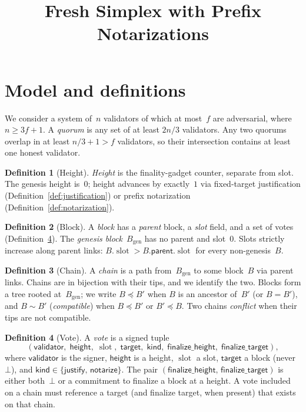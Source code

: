 \documentclass{article}
\title{Fresh Simplex with Prefix Notarizations}
\newcommand{\genesis}{\ensuremath{B_{\mathrm{gen}}}}
\newcommand{\slot}[0]{\ensuremath{\operatorname{\mathrm{slot}}}}
\newcommand{\target}{\mathsf{target}}
\newcommand{\kind}{\mathsf{kind}}
\newcommand{\height}{\mathsf{height}}
\newcommand{\validator}{\mathsf{validator}}
\newcommand{\just}{\ensuremath{\mathsf{justify}}\xspace}
\newcommand{\notar}{\ensuremath{\mathsf{notarize}}\xspace}
\newcommand{\parent}{\mathsf{parent}}
\newcommand{\finalizeHeight}{\mathsf{finalize\_height}}
\newcommand{\finalizeTarget}{\mathsf{finalize\_target}}
\theoremstyle{plain}
\theoremstyle{definition}
\newtheorem{definition}{Definition}
\theoremstyle{remark}
\begin{document}
\maketitle

\section{Model and definitions}

We consider a system of~$n$ validators of which at most~$f$ are adversarial, where $n \geq 3f + 1$.
A \emph{quorum} is any set of at least $2n/3$ validators.
Any two quorums overlap in at least $n/3 + 1 > f$ validators, so their intersection contains at least one honest validator.

\begin{definition}[Height]\label{def:height}
\emph{Height} is the finality-gadget counter, separate from slot.
The genesis height is~$0$; height advances by exactly~$1$ via fixed-target justification (Definition~\ref{def:justification}) or prefix notarization (Definition~\ref{def:notarization}).
\end{definition}

\begin{definition}[Block]\label{def:block}
A \emph{block} has a \emph{parent} block, a \emph{slot} field, and a set of votes (Definition~\ref{def:vote}).
The \emph{genesis block}~$\genesis$ has no parent and slot~$0$.
Slots strictly increase along parent links: $B.\slot > B.\parent.\slot$ for every non-genesis~$B$.
\end{definition}

\begin{definition}[Chain]\label{def:chain}
A \emph{chain} is a path from~$\genesis$ to some block~$B$ via parent links.
Chains are in bijection with their tips, and we identify the two.
Blocks form a tree rooted at~$\genesis$; we write $B \preceq B'$ when $B$ is an ancestor of~$B'$ (or $B = B'$), and $B \sim B'$ (\emph{compatible}) when $B \preceq B'$ or $B' \preceq B$.
Two chains \emph{conflict} when their tips are not compatible.
\end{definition}

\begin{definition}[Vote]\label{def:vote}
A \emph{vote} is a signed tuple
\[
  (\validator,\; \height,\; \slot,\; \target,\; \kind,\; \finalizeHeight,\; \finalizeTarget),
\]
where $\validator$ is the signer, $\height$ is a height, $\slot$ a slot, $\target$ a block (never~$\bot$), and $\kind \in \{\just,\, \notar\}$.
The pair $(\finalizeHeight,\, \finalizeTarget)$ is either both~$\bot$ or a commitment to finalize a block at a height.
A vote included on a chain must reference a target (and finalize target, when present) that exists on that chain.
\end{definition}
\end{document}
